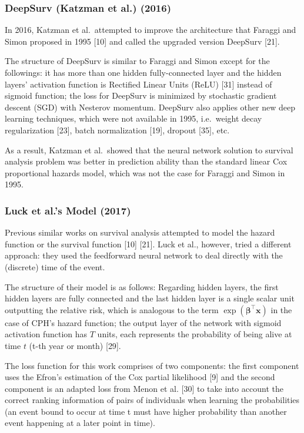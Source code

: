 \documentclass[
]{article}
\begin{document}
\hypertarget{deepsurv-katzman-et-al.-2016}{%
\subsubsection{DeepSurv (Katzman et al.) (2016)}\label{deepsurv-katzman-et-al.-2016}}

In 2016, Katzman et al.~attempted to improve the architecture that Faraggi and Simon proposed in 1995 {[}10{]} and called the upgraded version DeepSurv {[}21{]}.

The structure of DeepSurv is similar to Faraggi and Simon except for the followings: it has more than one hidden fully-connected layer and the hidden layers' activation function is Rectified Linear Units (ReLU) {[}31{]} instead of sigmoid function; the loss for DeepSurv is minimized by stochastic gradient descent (SGD) with Nesterov momentum. DeepSurv also applies other new deep learning techniques, which were not available in 1995, i.e.~weight decay regularization {[}23{]}, batch normalization {[}19{]}, dropout {[}35{]}, etc.

As a result, Katzman et al.~showed that the neural network solution to survival analysis problem was better in prediction ability than the standard linear Cox proportional hazards model, which was not the case for Faraggi and Simon in 1995.

\hypertarget{luck-et-al.s-model-2017}{%
\subsubsection{Luck et al.'s Model (2017)}\label{luck-et-al.s-model-2017}}

Previous similar works on survival analysis attempted to model the hazard function or the survival function {[}10{]} {[}21{]}. Luck et al., however, tried a different approach: they used the feedforward neural network to deal directly with the (discrete) time of the event.

The structure of their model is as follows: Regarding hidden layers, the first hidden layers are fully connected and the last hidden layer is a single scalar unit outputting the relative risk, which is analogous to the term \(\exp(\mathbf{\boldsymbol\beta}^\intercal \mathbf{x})\) in the case of CPH's hazard function; the output layer of the network with sigmoid activation function has \(T\) units, each represents the probability of being alive at time \(t\) (t-th year or month) {[}29{]}.

The loss function for this work comprises of two components: the first component uses the Efron's estimation of the Cox partial likelihood {[}9{]} and the second component is an adapted loss from Menon et al. {[}30{]} to take into account the correct ranking information of pairs of individuals when learning the probabilities (an event bound to occur at time t must have higher probability than another event happening at a later point in time).
\end{document}
